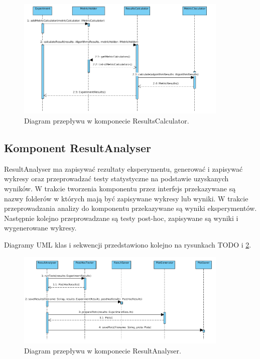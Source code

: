 \documentclass[12pt]{article}
\begin{document}
\begin{figure}
	\centering
	\includegraphics[width=0.9\textwidth]{img/sequenceResultsCalculator.png}
	\caption{Diagram przepływu w komponecie ResultsCalculator.}
	\label{fig:sequenceResultsCalculator}
\end{figure}

\subsection{Komponent ResultAnalyser}

ResultAnalyser ma zapisywać rezultaty eksperymentu, generować i zapisywać wykresy oraz przeprowadzać testy statystyczne na podstawie uzyskanych wyników. W trakcie tworzenia komponentu przez interfejs przekazywane są nazwy folderów w których mają być zapisywane wykresy lub wyniki. W trakcie przeprowadzania analizy do komponentu przekazywane są wyniki eksperymentów. Następnie kolejno przeprowadzane są testy post-hoc, zapisywane są wyniki i wygenerowane wykresy. 


Diagramy UML klas i sekwencji przedstawiono kolejno na rysunkach TODO i \ref{fig:sequenceResultAnalyser}.

\begin{figure}
	\centering
	\includegraphics[width=0.9\textwidth]{img/sequenceResultAnalyser.png}
	\caption{Diagram przepływu w komponecie ResultAnalyser.}
	\label{fig:sequenceResultAnalyser}
\end{figure}
\end{document}
